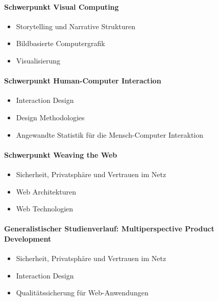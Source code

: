 \paragraph{Schwerpunkt Visual
Computing}\label{schwerpunkt-visual-computing}

\begin{itemize}
\tightlist
\item
  Storytelling und Narrative Strukturen
\item
  Bildbasierte Computergrafik
\item
  Visualisierung
\end{itemize}

\paragraph{Schwerpunkt Human-Computer
Interaction}\label{schwerpunkt-human-computer-interaction}

\begin{itemize}
\tightlist
\item
  Interaction Design
\item
  Design Methodologies
\item
  Angewandte Statistik für die Mensch-Computer Interaktion
\end{itemize}

\paragraph{Schwerpunkt Weaving the
Web}\label{schwerpunkt-weaving-the-web}

\begin{itemize}
\tightlist
\item
  Sicherheit, Privatsphäre und Vertrauen im Netz
\item
  Web Architekturen
\item
  Web Technologien
\end{itemize}

\paragraph{Generalistischer Studienverlauf: Multiperspective Product
Development}\label{generalistischer-studienverlauf-multiperspective-product-development}

\begin{itemize}
\tightlist
\item
  Sicherheit, Privatsphäre und Vertrauen im Netz
\item
  Interaction Design
\item
  Qualitätssicherung für Web-Anwendungen
\end{itemize}

